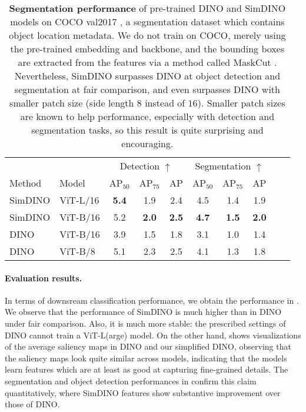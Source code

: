 \documentclass[\toplevelprefix/book-main.tex]{subfiles}
\begin{document}
\begin{table}
    \centering 
    \begin{tabular}{@{}llcccccccc@{}}
        \toprule
         &  & \multicolumn{3}{c}{Detection $\uparrow$} &  \multicolumn{3}{c}{Segmentation $\uparrow$} \\ 
        Method & Model & AP$_{50}$  & AP$_{75}$ & AP & AP$_{50}$ & AP$_{75}$ & AP  \\ 
        \midrule
        SimDINO &ViT-L/16 &\bf 5.4 &1.9 &2.4 &4.5 &1.4 &1.9 \\
        SimDINO &ViT-B/16 &5.2 & \bf 2.0 & \bf 2.5 & \bf4.7 & \bf 1.5 & \bf 2.0 \\
        DINO &ViT-B/16 &3.9 &1.5 &1.8 &3.1 &1.0 &1.4 \\
        \midrule
        \color{gray} DINO & \color{gray} ViT-B/8 & \color{gray}5.1 & \color{gray}2.3 & \color{gray}2.5 & \color{gray}4.1 & \color{gray}1.3 & \color{gray}1.8 \\
        \bottomrule
    \end{tabular}
    \caption{\small\textbf{Segmentation performance} of pre-trained DINO and SimDINO models on COCO val2017 \citep{lin2014microsoft}, a segmentation dataset which contains object location metadata. We do not train on COCO, merely using the pre-trained embedding and backbone, and the bounding boxes are extracted from the features via a method called MaskCut \citep{wang2023cut}. Nevertheless, SimDINO surpasses DINO at object detection and segmentation at fair comparison, and even surpasses DINO with smaller patch size (side length \(8\) instead of \(16\)). Smaller patch sizes are known to help performance, especially with detection and segmentation tasks, so this result is quite surprising and encouraging.}
    \label{tab:dino_segmentation}
\end{table}

\paragraph{Evaluation results.} In terms of downsream classification performance, we obtain the performance in . We observe that the performance of SimDINO is much higher than in DINO under fair comparison. Also, it is much more stable: the prescribed settings of DINO cannot train a ViT-L(arge) model. On the other hand,  shows visualizations of the average saliency maps in DINO and our simplified DINO, observing that the saliency maps look quite similar across models, indicating that the models learn features which are at least as good at capturing fine-grained details. The segmentation and object detection performances in  confirm this claim quantitatively, where SimDINO features show substantive improvement over those of DINO.
\end{document}
